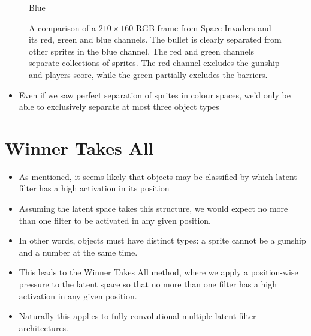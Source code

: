 \begin{figure}[h!]
\begin{multicols}{4}
    \caption{Blue}
\end{multicols}
\caption{A comparison of a $210 \times 160$ RGB frame from Space Invaders and its red, green and blue channels. The bullet is clearly separated from other sprites in the blue channel. The red and green channels separate collections of sprites. The red channel excludes the gunship and players score, while the green partially excludes the barriers.}
\label{fig:separating_colour_spaces}
\end{figure}

\begin{itemize}

\item Even if we saw perfect separation of sprites in colour spaces, we'd only be able to exclusively separate at most three object types
\end{itemize}



%
%
%
%
%
\section{Winner Takes All}

\begin{itemize}
\item As mentioned, it seems likely that objects may be classified by which latent filter has a high activation in its position
\item Assuming the latent space takes this structure, we would expect no more than one filter to be activated in any given position.
\item In other words, objects must have distinct types: a sprite cannot be a gunship and a number at the same time.
\item This leads to the Winner Takes All method, where we apply a position-wise pressure to the latent space so that no more than one filter has a high activation in any given position.
\item Naturally this applies to fully-convolutional multiple latent filter architectures.
\end{itemize}


